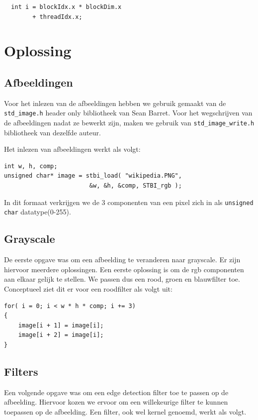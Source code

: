 \documentclass[10pt, twocolumn, a4paper]{article}
\begin{document}
\begin{verbatim}
  int i = blockIdx.x * blockDim.x 
		+ threadIdx.x;
\end{verbatim}

\section{Oplossing}
\subsection{Afbeeldingen}
Voor het inlezen van de afbeeldingen hebben we gebruik gemaakt van de \texttt{std_image.h} header only bibliotheek van Sean Barret. Voor het wegschrijven van de afbeeldingen nadat ze bewerkt zijn, maken we gebruik van \texttt{std_image_write.h} bibliotheek van dezelfde auteur.

Het inlezen van afbeeldingen werkt als volgt:

\begin{verbatim}
int w, h, comp;
unsigned char* image = stbi_load( "wikipedia.PNG", 
                        &w, &h, &comp, STBI_rgb );
\end{verbatim}

In dit formaat verkrijgen we de 3 componenten van een pixel zich in als \texttt{unsigned char} datatype(0-255).

\subsection{Grayscale}
De eerste opgave was om een afbeelding te veranderen naar grayscale. Er zijn hiervoor meerdere oplossingen. Een eerste oplossing is om de rgb componenten aan elkaar gelijk te stellen. We passen dus een rood, groen en blauwfilter toe. Conceptueel ziet dit er voor een roodfilter als volgt uit:

\begin{verbatim}
for( i = 0; i < w * h * comp; i += 3)
{
    image[i + 1] = image[i];
    image[i + 2] = image[i];
}
\end{verbatim}

\subsection{Filters}
Een volgende opgave was om een edge detection filter toe te passen op de afbeelding. Hiervoor kozen we ervoor om een willekeurige filter te kunnen toepassen op de afbeelding. Een filter, ook wel kernel genoemd, werkt als volgt.
\end{document}
